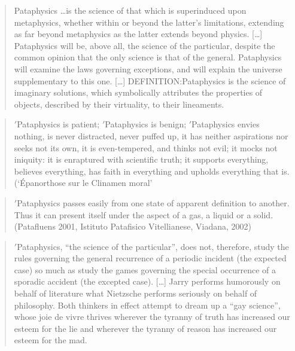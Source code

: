 \begin{quotation}
  Pataphysics \ldots is the science of that which is superinduced upon metaphysics, whether within or beyond the latter's limitations, extending as far beyond metaphysics as the latter extends beyond physics. [\ldots] Pataphysics will be, above all, the science of the particular, despite the common opinion that the only science is that of the general. Pataphysics will examine the laws governing exceptions, and will explain the universe supplementary to this one. [\ldots] DEFINITION:\@ Pataphysics is the science of imaginary solutions, which symbolically attributes the properties of objects, described by their virtuality, to their lineaments. 
\end{quotation}

\begin{quotation}
  $'$Pataphysics is patient; $'$Pataphysics is benign; $'$Pataphysics envies nothing, is never distracted, never puffed up, it has neither aspirations nor seeks not its own, it is even-tempered, and thinks not evil; it mocks not iniquity: it is enraptured with scientific truth; it supports everything, believes everything, has faith in everything and upholds everything that is. (`Épanorthose sur le Clinamen moral' 
\end{quotation}

\begin{quotation}
  $'$Pataphysics passes easily from one state of apparent definition to another. Thus it can present itself under the aspect of a gas, a liquid or a solid. (Patafluens 2001, Istituto Patafisico Vitellianese, Viadana, 2002) 
\end{quotation}

\begin{quotation}
  $'$Pataphysics, ``the science of the particular'', does not, therefore, study the rules governing the general recurrence of a periodic incident (the expected case) so much as study the games governing the special occurrence of a sporadic accident (the excepted case). […] Jarry performs humorously on behalf of literature what Nietzsche performs seriously on behalf of philosophy. Both thinkers in effect attempt to dream up a ``gay science'', whose joie de vivre thrives wherever the tyranny of truth has increased our esteem for the lie and wherever the tyranny of reason has increased our esteem for the mad. 
\end{quotation}

